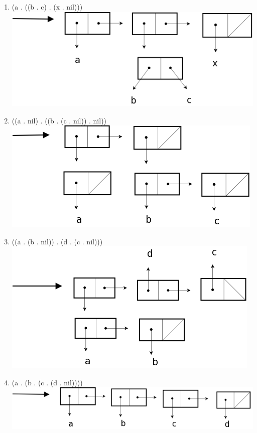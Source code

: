 \documentclass[a4paper, 11pt]{article}
\begin{document}
\begin{enumerate}
    \item (a . ((b . c) . (x . nil)))\\ \includegraphics[scale=0.3]{reponse1.png}
    \item ((a . nil) . ((b . (c . nil)) . nil))\\ \includegraphics[scale=0.3]{reponse2.png}
    \item ((a . (b . nil)) . (d . (c . nil)))\\ \includegraphics[scale=0.3]{reponse3.png}
    \item (a . (b . (c . (d . nil))))\\ \includegraphics[scale=0.3]{reponse4.png}

\end{enumerate}
\end{document}
